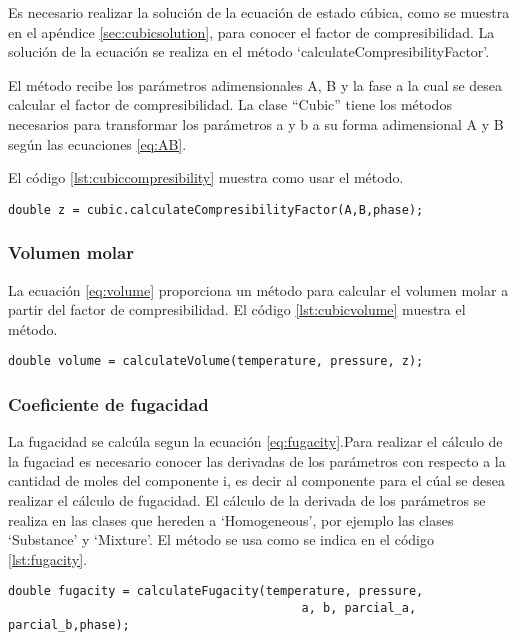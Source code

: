 	Es necesario realizar la solución de la ecuación de estado cúbica, como se muestra en el apéndice \ref{sec:cubicsolution}, para conocer el factor de compresibilidad. La solución de la ecuación se realiza en el método `calculateCompresibilityFactor'.

	El método recibe los parámetros adimensionales A, B y la fase a la cual se desea calcular el factor de compresibilidad. La clase ``Cubic'' tiene los métodos necesarios para transformar los parámetros a y b a su forma adimensional A y B según las ecuaciones \ref{eq:AB}.

	El código \ref{lst:cubiccompresibility} muestra como usar el método.
\begin{lstlisting}[label={lst:cubiccompresibility},caption={Cálculo del factor de compresibilidad con una ecuación de estado cúbica, proporcionando como argumento los parámetros adimensionales $A$,$B$, y la fase a la cual se desea calcular el factor}]
	double z = cubic.calculateCompresibilityFactor(A,B,phase);
\end{lstlisting}
	\subsubsection{Volumen molar}

	La ecuación \ref{eq:volume} proporciona un método para calcular el volumen molar a partir del factor de compresibilidad. El código \ref{lst:cubicvolume} muestra el método.
\begin{lstlisting}[label={lst:cubicvolume},caption={Cálculo del volumen molar usando una ecuación de estado cúbica, el método recibe los parámetros de temperatura, presión y factor acéntrico}]
	double volume = calculateVolume(temperature, pressure, z);
\end{lstlisting}	
	\subsubsection{Coeficiente de fugacidad}
	La fugacidad se calcúla segun la ecuación \ref{eq:fugacity}.Para realizar el cálculo de la fugaciad es necesario conocer las derivadas de los parámetros con respecto a la cantidad de moles del componente i, es decir al componente para el cúal se desea realizar el cálculo de fugacidad. El cálculo de la derivada de los parámetros se realiza en las clases que hereden a `Homogeneous', por ejemplo las clases `Substance' y `Mixture'.
	El método se usa como se indica en el código \ref{lst:fugacity}.
\begin{lstlisting}[label={lst:fugacity},caption={Cálculo de fugacidad usando una ecuación de estad cúbica, el método recibe los parámetros de temperatura, presión ,los parámetros de la ecuación cúbica $a$ y $b$, las derivadas con respecto a la cantidad de moles $partial\_a$, $partial\_b$ y finalmente la fase a la que se desea el cálculo de la fugacidad.}]
	double fugacity = calculateFugacity(temperature, pressure,
										 a, b, parcial_a, parcial_b,phase);
\end{lstlisting}


